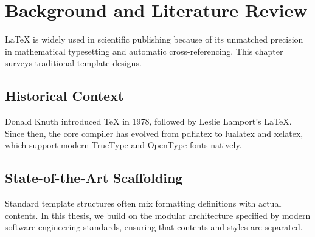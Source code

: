 \chapter{Background and Literature Review}
\label{ch:background}
LaTeX is widely used in scientific publishing because of its unmatched precision in mathematical typesetting and automatic cross-referencing. This chapter surveys traditional template designs.

\section{Historical Context}
Donald Knuth introduced TeX in 1978, followed by Leslie Lamport's LaTeX. Since then, the core compiler has evolved from pdflatex to lualatex and xelatex, which support modern TrueType and OpenType fonts natively.

\section{State-of-the-Art Scaffolding}
Standard template structures often mix formatting definitions with actual contents. In this thesis, we build on the modular architecture specified by modern software engineering standards, ensuring that contents and styles are separated.
